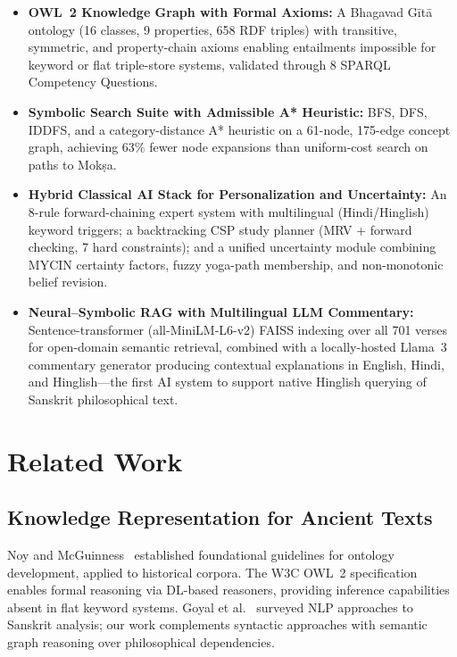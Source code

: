 \documentclass[conference]{IEEEtran}
\begin{document}
\begin{itemize}[leftmargin=*]
  \item \textbf{OWL~2 Knowledge Graph with Formal Axioms:} A Bhagavad
        G\={i}t\={a} ontology (16 classes, 9 properties, 658 RDF triples)
        with transitive, symmetric, and property-chain axioms enabling
        entailments impossible for keyword or flat triple-store systems,
        validated through 8 SPARQL Competency Questions.

  \item \textbf{Symbolic Search Suite with Admissible A* Heuristic:}
        BFS, DFS, IDDFS, and a category-distance A* heuristic on a
        61-node, 175-edge concept graph, achieving 63\% fewer node
        expansions than uniform-cost search on paths to Mok\d{s}a.

  \item \textbf{Hybrid Classical AI Stack for Personalization and
        Uncertainty:} An 8-rule forward-chaining expert system with
        multilingual (Hindi/Hinglish) keyword triggers; a backtracking
        CSP study planner (MRV + forward checking, 7 hard constraints);
        and a unified uncertainty module combining MYCIN certainty factors,
        fuzzy yoga-path membership, and non-monotonic belief revision.

  \item \textbf{Neural--Symbolic RAG with Multilingual LLM Commentary:}
        Sentence-transformer (all-MiniLM-L6-v2) FAISS indexing over all
        701 verses for open-domain semantic retrieval, combined with a
        locally-hosted Llama~3 commentary generator producing contextual
        explanations in English, Hindi, and Hinglish—the first AI system
        to support native Hinglish querying of Sanskrit philosophical text.
\end{itemize}

\section{Related Work}

\subsection{Knowledge Representation for Ancient Texts}

Noy and McGuinness~\cite{noy2001ontology} established foundational guidelines
for ontology development, applied to historical corpora. The W3C OWL~2
specification~\cite{mcguinness2004owl} enables formal reasoning via DL-based
reasoners, providing inference capabilities absent in flat keyword systems.
Goyal et al.~\cite{goyal2012sanskrit} surveyed NLP approaches to Sanskrit
analysis; our work complements syntactic approaches with semantic graph
reasoning over philosophical dependencies.
\end{document}
